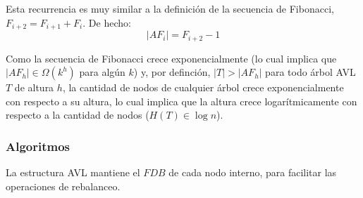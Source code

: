 \documentclass{article}
\newcommand{\BigOmega}[1]{{\Omega(#1)}}
\begin{document}
Esta recurrencia es muy similar a la definición de la secuencia de Fibonacci, $F_{i+2} = F_{i+1} + F_i$. De hecho:
$$|AF_i| = F_{i+2} - 1$$

Como la secuencia de Fibonacci crece exponencialmente (lo cual implica que $|AF_h| \in \BigOmega{k^h}$ para algún $k$) y, por definción, $|T| > |AF_h|$ para todo árbol AVL $T$ de altura $h$, la cantidad de nodos de cualquier árbol crece exponencialmente con respecto a su altura, lo cual implica que la altura crece logarítmicamente con respecto a la cantidad de nodos ($H(T) \in \log{n}$).

\subsubsection{Algoritmos}

La estructura AVL mantiene el $FDB$ de cada nodo interno, para facilitar las operaciones de rebalanceo.
\end{document}
